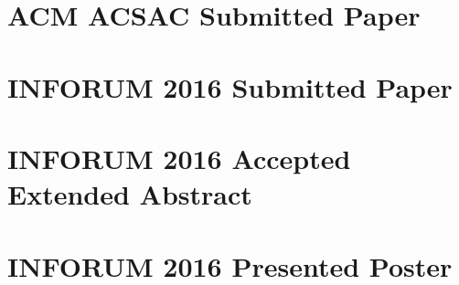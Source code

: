 
\chapter{ACM ACSAC Submitted Paper}
\label{appendix:acm_acsac}



\chapter{INFORUM 2016 Submitted Paper}
\label{appendix:inforum_paper}



\chapter{INFORUM 2016 Accepted Extended Abstract}
\label{appendix:inforum_abstract}



\chapter{INFORUM 2016 Presented Poster}
\label{appendix:inforum_poster}



